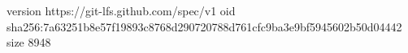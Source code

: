 version https://git-lfs.github.com/spec/v1
oid sha256:7a63251b8e57f19893c8768d290720788d761cfc9ba3e9bf5945602b50d04442
size 8948
